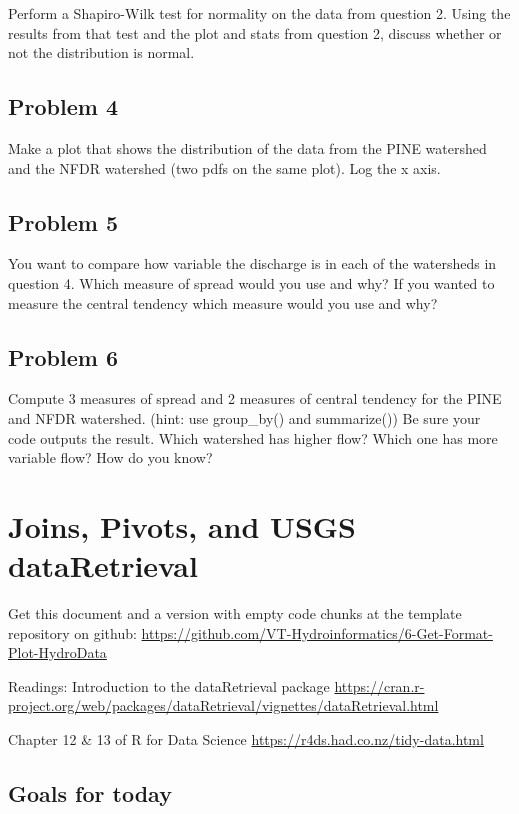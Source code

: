 \documentclass[
]{book}
\begin{document}
Perform a Shapiro-Wilk test for normality on the data from question 2. Using the results from that test and the plot and stats from question 2, discuss whether or not the distribution is normal.

\hypertarget{problem-4-1}{%
\section{Problem 4}\label{problem-4-1}}

Make a plot that shows the distribution of the data from the PINE watershed and the NFDR watershed (two pdfs on the same plot). Log the x axis.

\hypertarget{problem-5-1}{%
\section{Problem 5}\label{problem-5-1}}

You want to compare how variable the discharge is in each of the watersheds in question 4. Which measure of spread would you use and why? If you wanted to measure the central tendency which measure would you use and why?

\hypertarget{problem-6-1}{%
\section{Problem 6}\label{problem-6-1}}

Compute 3 measures of spread and 2 measures of central tendency for the PINE and NFDR watershed. (hint: use group\_by() and summarize()) Be sure your code outputs the result. Which watershed has higher flow? Which one has more variable flow? How do you know?

\hypertarget{getdata}{%
\chapter{Joins, Pivots, and USGS dataRetrieval}\label{getdata}}

Get this document and a version with empty code chunks at the template repository on github: \url{https://github.com/VT-Hydroinformatics/6-Get-Format-Plot-HydroData}

Readings: Introduction to the dataRetrieval package \url{https://cran.r-project.org/web/packages/dataRetrieval/vignettes/dataRetrieval.html}

Chapter 12 \& 13 of R for Data Science \url{https://r4ds.had.co.nz/tidy-data.html}

\hypertarget{goals-for-today}{%
\section{Goals for today}\label{goals-for-today}}
\end{document}
